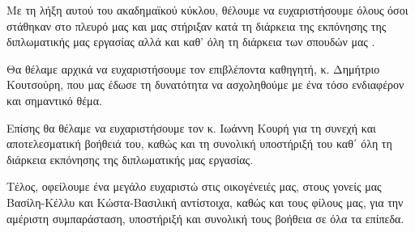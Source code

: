\begin{acknowledgementsgr}

Με τη λήξη αυτού του ακαδημαϊκού κύκλου, θέλουμε να ευχαριστήσουμε όλους όσοι στάθηκαν στο πλευρό μας και μας στήριξαν κατά τη διάρκεια της εκπόνησης της διπλωματικής μας εργασίας αλλά και καθ’ όλη τη διάρκεια των σπουδών μας .

Θα θέλαμε αρχικά να ευχαριστήσουμε τον επιβλέποντα καθηγητή, κ. Δημήτριο Κουτσούρη, που μας έδωσε τη δυνατότητα να ασχοληθούμε με ένα τόσο ενδιαφέρον και σημαντικό θέμα.

Επίσης θα θέλαμε να ευχαριστήσουμε τον κ. Ιωάννη Κουρή για τη συνεχή και αποτελεσματική βοήθειά του, καθώς και τη συνολική υποστήριξή του καθ΄ όλη τη διάρκεια εκπόνησης της διπλωματικής μας εργασίας.

Τέλος, οφείλουμε ένα μεγάλο ευχαριστώ στις οικογένειές μας, στους γονείς μας Βασίλη-Κέλλυ και Κώστα-Βασιλική αντίστοιχα, καθώς και τους φίλους μας, για την αμέριστη συμπαράσταση, υποστήριξή και συνολική τους βοήθεια σε όλα τα επίπεδα.


\end{acknowledgementsgr}
